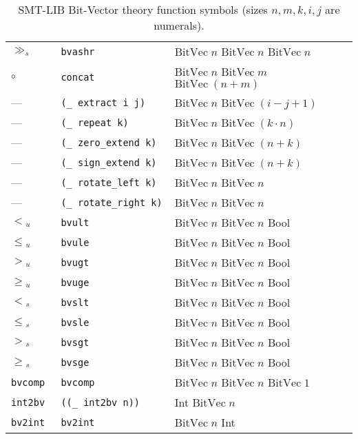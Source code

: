 \begin{table}
\begin{tabular}{lll}
$\gg_s$ & \tt{bvashr} & \(\mathrm{BitVec}\;n\)\; \(\mathrm{BitVec}\;n\)\; \(\mathrm{BitVec}\;n\) \\
$\circ$ & \tt{concat} & \(\mathrm{BitVec}\;n\)\; \(\mathrm{BitVec}\;m\)\; \(\mathrm{BitVec}\;(n{+}m)\) \\
— & \tt{(\_ extract i j)} & \(\mathrm{BitVec}\;n\)\; \(\mathrm{BitVec}\;(i{-}j{+}1)\) \\
— & \tt{(\_ repeat k)} & \(\mathrm{BitVec}\;n\)\; \(\mathrm{BitVec}\;(k\cdot n)\) \\
— & \tt{(\_ zero\_extend k)} & \(\mathrm{BitVec}\;n\)\; \(\mathrm{BitVec}\;(n{+}k)\) \\
— & \tt{(\_ sign\_extend k)} & \(\mathrm{BitVec}\;n\)\; \(\mathrm{BitVec}\;(n{+}k)\) \\
— & \tt{(\_ rotate\_left k)} & \(\mathrm{BitVec}\;n\)\; \(\mathrm{BitVec}\;n\) \\
— & \tt{(\_ rotate\_right k)} & \(\mathrm{BitVec}\;n\)\; \(\mathrm{BitVec}\;n\) \\
$<$\(_u\) & \tt{bvult} & \(\mathrm{BitVec}\;n\)\; \(\mathrm{BitVec}\;n\)\; Bool \\
$\le$\(_u\) & \tt{bvule} & \(\mathrm{BitVec}\;n\)\; \(\mathrm{BitVec}\;n\)\; Bool \\
$>$\(_u\) & \tt{bvugt} & \(\mathrm{BitVec}\;n\)\; \(\mathrm{BitVec}\;n\)\; Bool \\
$\ge$\(_u\) & \tt{bvuge} & \(\mathrm{BitVec}\;n\)\; \(\mathrm{BitVec}\;n\)\; Bool \\
$<$\(_s\) & \tt{bvslt} & \(\mathrm{BitVec}\;n\)\; \(\mathrm{BitVec}\;n\)\; Bool \\
$\le$\(_s\) & \tt{bvsle} & \(\mathrm{BitVec}\;n\)\; \(\mathrm{BitVec}\;n\)\; Bool \\
$>$\(_s\) & \tt{bvsgt} & \(\mathrm{BitVec}\;n\)\; \(\mathrm{BitVec}\;n\)\; Bool \\
$\ge$\(_s\) & \tt{bvsge} & \(\mathrm{BitVec}\;n\)\; \(\mathrm{BitVec}\;n\)\; Bool \\
\tt{bvcomp} & \tt{bvcomp} & \(\mathrm{BitVec}\;n\)\; \(\mathrm{BitVec}\;n\)\; \(\mathrm{BitVec}\;1\) \\
\tt{int2bv} & \tt{((\_ \tt{int2bv}~n))} & Int \;\(\mathrm{BitVec}\;n\) \\
\tt{bv2int} & \tt{bv2int} & \(\mathrm{BitVec}\;n\)\; Int \\
\bottomrule
\end{tabular}
\caption{SMT-LIB Bit-Vector theory function symbols (sizes \(n,m,k,i,j\) are numerals).}
\label{tab:bv-funs}
\end{table}

